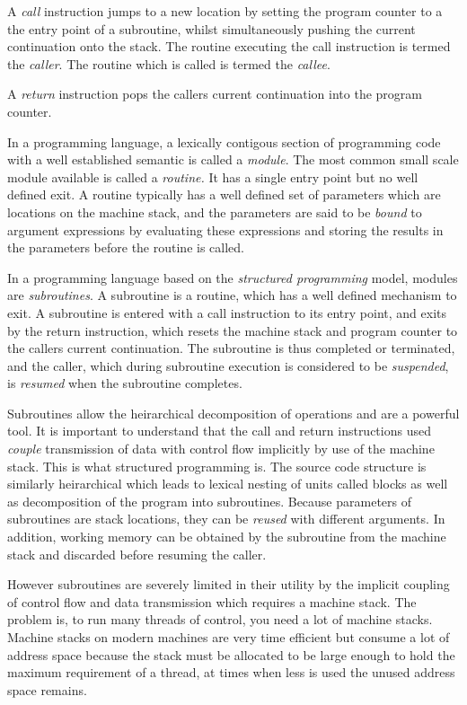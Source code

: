 \documentclass[oneside]{book}
\begin{document}
A {\em call} instruction jumps to a new location by setting the program counter
to a the entry point of a subroutine, whilst simultaneously pushing the
current continuation onto the stack. The routine executing the call
instruction is termed the {\em caller}. The routine which is 
called is termed the {\em callee}. 


A {\em return} instruction pops the callers current continuation into the
program counter. 

In a programming language, a lexically contigous section of programming
code with a well established semantic is called a {\em module}. The most
common small scale module available is called a {\em routine.} It has
a single entry point but no well defined exit. A routine typically has
a well defined set of parameters which are locations on the machine
stack, and the parameters are said to be {\em bound} to argument expressions
by evaluating these expressions and storing the results in the parameters
before the routine is called. 

In a programming language based on the {\em structured programming} model,
modules are {\em subroutines}. A subroutine is a routine, which has a well
defined mechanism to exit. A subroutine is entered with a call instruction
to its entry point, and exits by the return instruction, which resets the
machine stack and program counter to the callers current continuation. 
The subroutine is thus completed or terminated, and the caller, 
which during subroutine execution is considered to be {\em suspended}, is 
{\em resumed} when the subroutine completes.

Subroutines allow the heirarchical decomposition of operations and are
a powerful tool. It is important to understand that the call and return
instructions used {\em couple} transmission of data with control flow
implicitly by use of the machine stack. This is what structured
programming is. The source code structure is similarly heirarchical
which leads to lexical nesting of units called blocks as well as 
decomposition of the program into subroutines. Because parameters
of subroutines are stack locations, they can be {\em reused} with different
arguments. In addition, working memory can be obtained by the subroutine
from the machine stack and discarded before resuming the caller.

However subroutines are severely limited in their utility by the 
implicit coupling of control flow and data transmission which requires
a machine stack. The problem is, to run many threads of control, you need
a lot of machine stacks. Machine stacks on modern machines are very time efficient
but consume a lot of address space because the stack must be allocated
to be large enough to hold the maximum requirement of a thread, at times
when less is used the unused address space remains.
\end{document}
